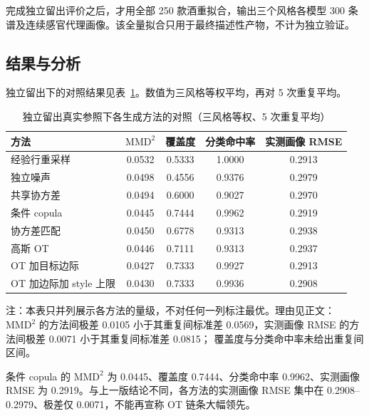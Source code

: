 \documentclass[UTF8,a4paper,zihao=-4]{ctexart}
\numberwithin{figure}{section}
\numberwithin{table}{section}
\numberwithin{equation}{section}
\begin{document}
完成独立留出评价之后，才用全部 250 款酒重拟合，输出三个风格各模型 300 条谱及连续感官代理画像。该全量拟合只用于最终描述性产物，不计为独立验证。

\subsection{结果与分析}

独立留出下的对照结果见表~\ref{tab:q3-res}。数值为三风格等权平均，再对 5 次重复平均。

\begin{table}[H]
  \centering
  \caption{独立留出真实参照下各生成方法的对照（三风格等权、5 次重复平均）}
  \label{tab:q3-res}
  \small
  \begin{tabularx}{\textwidth}{@{}>{\raggedright\arraybackslash}X c c c c@{}}
    \toprule
    方法 & $\mathrm{MMD}^{2}$ & 覆盖度 & 分类命中率 & 实测画像 RMSE \\
    \midrule
    经验行重采样 & 0.0532 & 0.5333 & 1.0000 & 0.2913 \\
    独立噪声 & 0.0498 & 0.4556 & 0.9376 & 0.2979 \\
    共享协方差 & 0.0494 & 0.6000 & 0.9027 & 0.2970 \\
    条件 copula & 0.0445 & 0.7444 & 0.9962 & 0.2919 \\
    协方差匹配 & 0.0450 & 0.6778 & 0.9313 & 0.2938 \\
    高斯 OT & 0.0446 & 0.7111 & 0.9313 & 0.2937 \\
    OT 加目标边际 & 0.0427 & 0.7333 & 0.9927 & 0.2913 \\
    OT 加边际加 style 上限 & 0.0430 & 0.7333 & 0.9936 & 0.2908 \\
    \bottomrule
  \end{tabularx}
  \par\vspace{3pt}
  \begin{minipage}{\textwidth}
    \footnotesize 注：本表只并列展示各方法的量级，不对任何一列标注最优。理由见正文：$\mathrm{MMD}^{2}$ 的方法间极差
     0.0105 小于其重复间标准差 0.0569，实测画像 RMSE 的方法间极差 0.0071 小于其重复间标准差 0.0815；
     覆盖度与分类命中率未给出重复间区间。
  \end{minipage}
\end{table}

条件 copula 的 $\mathrm{MMD}^{2}$ 为 0.0445、覆盖度 0.7444、分类命中率 0.9962、实测画像 RMSE 为 0.2919。与上一版结论不同，各方法的实测画像 RMSE 集中在 0.2908--0.2979、极差仅 0.0071，不能再宣称 OT 链条大幅领先。
\end{document}
